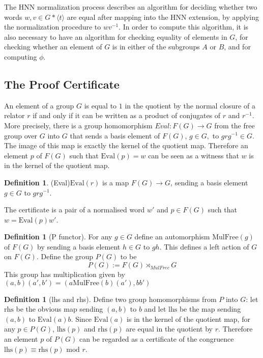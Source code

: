 \documentclass[12pt]{article} %
\theoremstyle{definition}
\theoremstyle{definition}
\theoremstyle{definition}
\theoremstyle{definition}
\theoremstyle{definition}
\newtheorem{defn}[theorem]{Definition}
\theoremstyle{definition}
\newtheorem{subdef}{Definition}[theorem]
\begin{document}
The HNN normalization process describes an algorithm for deciding
whether two words $w, v \in G \ast \langle t \rangle$ are equal
after mapping into the HNN extension, by applying the normalization procedure to
 $wv^{-1}$.
In order to compute this algorithm, it is also necessary to have an algorithm for checking equality
of elements in $G$,
for checking whether an element of $G$ is in either of the subgroups $A$ or $B$, and for computing $\phi$.

\subsection{The Proof Certificate}\label{proofcert}

An element of a group $G$ is equal to $1$ in the quotient by the normal closure
of a relator $r$ if and only if it can be written as a product of conjugates of $r$ and $r^{-1}$.
More precisely, there is a group homomorphism $\textit{Eval}: F(G) \to G$ from the free group
over $G$ into $G$ that sends a basis element of $F(G)$,
$g \in G,$ to $grg^{-1} \in G$. The image of this map is exactly the kernel of the quotient map.
Therefore an element $p$ of $F(G)$ such that $\text{Eval}(p) = w$
can be seen as a witness that $w$ is in the kernel of the quotient map.

\begin{defn}(Eval)\label{Eval}
  $\text{Eval}(r)$ is a map $F(G) \to G$, sending a basis element $g \in G$ to $grg^{-1}$.
\end{defn}

The certificate is a pair of a normalised word $w'$ and
$p \in F(G)$ such that $w = \text{Eval}(p) w'$.

\begin{defn}[P functor]
  For any $g \in G$ define an automorphism $\text{MulFree}(g)$ of $F(G)$ by sending a basis
  element $h \in G$ to $gh$. This defines a left action of $G$ on $F(G)$.
  Define the group $P(G)$ to be
  \begin{equation}
  P(G) := F(G) \rtimes_{MulFree} G
  \end{equation}
  This group has multiplication given by $(a, b) (a', b') = (a \text{MulFree}(b)(a'), bb')$
\end{defn}

\begin{subdef}[lhs and rhs]
Define two group homomorphisms from $P$ into $G$: let
$\text{rhs}$ be the obvious map sending $(a, b)$ to $b$ and let
$\text{lhs}$ be the map sending $(a,b)$ to $\text{Eval}(a)b$.
Since $\text{Eval}(a)$ is in the kernel of the quotient map,
for any $p\in P(G)$, $\text{lhs}(p)$ and $\text{rhs}(p)$ are equal in the quotient by $r$.
Therefore an element $p$ of $P(G)$ can be regarded as a certificate of the congruence
$\text{lhs}(p) \equiv \text{rhs}(p) \text{ mod } r$.
\end{subdef}
\end{document}
